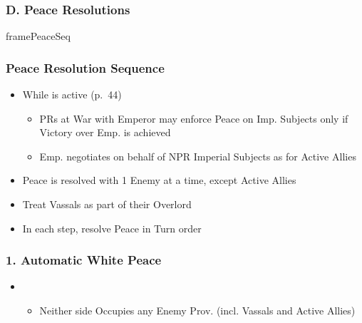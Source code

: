 \documentclass[10pt]{article}
\begin{document}
\subsubsection*{D. Peace Resolutions}\framebreak%
\begin{dynamiccontents*}{framePeaceSeq}
	\begin{multicols}{2}
		\subsubsection*{Peace Resolution Sequence }
		\begin{itemize}
			\item While  is active (p.~44)
			\begin{itemize}
				\item PRs at War with Emperor may enforce Peace on Imp. Subjects only if Victory over Emp. is achieved
				\item Emp. negotiates on behalf of NPR Imperial Subjects as for Active Allies
			\end{itemize}
			\item Peace is resolved with 1 Enemy at a time, except Active Allies
			\item Treat Vassals as part of their Overlord
			\item In each step, resolve Peace in Turn order
		\end{itemize}

		\subsubsection*{1. Automatic White Peace}
		\begin{itemize}
			\item {}
			\begin{itemize}
				\item Neither side Occupies any Enemy Prov. (incl. Vassals and Active Allies)
			\end{itemize}
		\end{itemize}


\end{multicols}
\end{dynamiccontents*}
\end{document}
